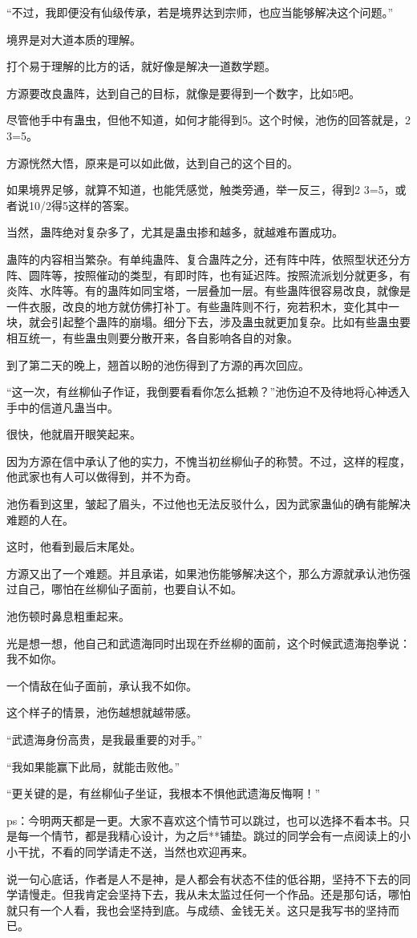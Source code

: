 \begin{this_body}
“不过，我即便没有仙级传承，若是境界达到宗师，也应当能够解决这个问题。”

境界是对大道本质的理解。

打个易于理解的比方的话，就好像是解决一道数学题。

方源要改良蛊阵，达到自己的目标，就像是要得到一个数字，比如5吧。

尽管他手中有蛊虫，但他不知道，如何才能得到5。这个时候，池伤的回答就是，2 3=5。

方源恍然大悟，原来是可以如此做，达到自己的这个目的。

如果境界足够，就算不知道，也能凭感觉，触类旁通，举一反三，得到2 3=5，或者说10/2得5这样的答案。

当然，蛊阵绝对复杂多了，尤其是蛊虫掺和越多，就越难布置成功。

蛊阵的内容相当繁杂。有单纯蛊阵、复合蛊阵之分，还有阵中阵，依照型状还分方阵、圆阵等，按照催动的类型，有即时阵，也有延迟阵。按照流派划分就更多，有炎阵、水阵等。有的蛊阵如同宝塔，一层叠加一层。有些蛊阵很容易改良，就像是一件衣服，改良的地方就仿佛打补丁。有些蛊阵则不行，宛若积木，变化其中一块，就会引起整个蛊阵的崩塌。细分下去，涉及蛊虫就更加复杂。比如有些蛊虫要相互统一，有些蛊虫则要分散开来，各自影响各自的对象。

到了第二天的晚上，翘首以盼的池伤得到了方源的再次回应。

“这一次，有丝柳仙子作证，我倒要看看你怎么抵赖？”池伤迫不及待地将心神透入手中的信道凡蛊当中。

很快，他就眉开眼笑起来。

因为方源在信中承认了他的实力，不愧当初丝柳仙子的称赞。不过，这样的程度，他武家也有人可以做得到，并不为奇。

池伤看到这里，皱起了眉头，不过他也无法反驳什么，因为武家蛊仙的确有能解决难题的人在。

这时，他看到最后末尾处。

方源又出了一个难题。并且承诺，如果池伤能够解决这个，那么方源就承认池伤强过自己，哪怕在丝柳仙子面前，也要自认不如。

池伤顿时鼻息粗重起来。

光是想一想，他自己和武遗海同时出现在乔丝柳的面前，这个时候武遗海抱拳说：我不如你。

一个情敌在仙子面前，承认我不如你。

这个样子的情景，池伤越想就越带感。

“武遗海身份高贵，是我最重要的对手。”

“我如果能赢下此局，就能击败他。”

“更关键的是，有丝柳仙子坐证，我根本不惧他武遗海反悔啊！”

ps：今明两天都是一更。大家不喜欢这个情节可以跳过，也可以选择不看本书。只是每一个情节，都是我精心设计，为之后**铺垫。跳过的同学会有一点阅读上的小小干扰，不看的同学请走不送，当然也欢迎再来。

说一句心底话，作者是人不是神，是人都会有状态不佳的低谷期，坚持不下去的同学请慢走。但我肯定会坚持下去，我从未太监过任何一个作品。还是那句话，哪怕就只有一个人看，我也会坚持到底。与成绩、金钱无关。这只是我写书的坚持而已。

\end{this_body}

